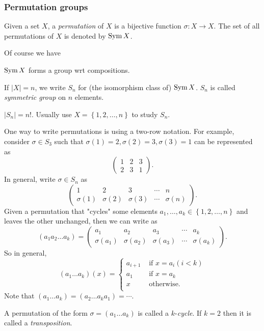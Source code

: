 \documentclass[a4paper]{article}
\begin{document}
\subsubsection{Permutation groups}
\begin{definition}
  Given a set $X$, a \textit{permutation} of $X$ is a bijective
  function $ \sigma:X\to X $. The set of all permutations of $X$ is
  denoted by $ \operatorname{Sym} X $.
\end{definition}
Of course we have
\begin{theorem}\label{thm:perm_group}
  $ \operatorname{Sym} X $ forms a group wrt compositions.
\end{theorem}
\begin{definition}
  If $ |X|=n $, we write $ S_n $ for (the isomorphism class of) $
  \operatorname{Sym} X $. $S_n$ is called \textit{symmetric group} on $n$ elements.
\end{definition}
\begin{remark}
  $ |S_n|=n! $. Usually use $ X=\left\{ 1,2,\dots,n\right\} $ to study $S_n$.
\end{remark}
One way to write permutations is using a two-row notation. For
example, consider $ \sigma\in S_3 $ such that $ \sigma(1)=2,
\sigma(2)=3, \sigma(3)=1 $ can be represented as
\[
  \begin{pmatrix}
    1&2&3\\
    2&3&1
  \end{pmatrix}
.\]
In general, write $ \sigma\in S_n $ as
\[
  \begin{pmatrix}
    1&2&3&\cdots&n\\
    \sigma(1)&\sigma(2)&\sigma(3)&\cdots&\sigma(n)
  \end{pmatrix}
.\]
Given a permutation that "cycles" some elements $ a_1,\dots,a_k \in
\left\{ 1,2,\dots,n\right\}$ and leaves the other unchanged, then we
can write as
\[
  (a_1 a_2 \dots a_k) =
  \begin{pmatrix}
    a_1&a_2&a_3&\cdots&a_k\\
    \sigma(a_1)&\sigma(a_2)&\sigma(a_3)&\cdots&\sigma(a_k)
  \end{pmatrix}
.\]
So in general,
\[
  (a_1 \dots a_k)(x) =
  \begin{cases}
    a_{i+1} &\text{ if } x=a_i(i<k)\\
    a_1 &\text{ if } x=a_k\\
    x &\text{ otherwise.}\\
  \end{cases}
\]
Note that $ (a_1 \dots a_k)=(a_2\dots a_{k} a_1)=\cdots $.
\begin{definition}
  A permutation of the form $ \sigma = (a_1 \dots a_k) $ is called a
  $k$-\textit{cycle}. If $k=2$ then it is called a \textit{transposition}.
\end{definition}
\end{document}
